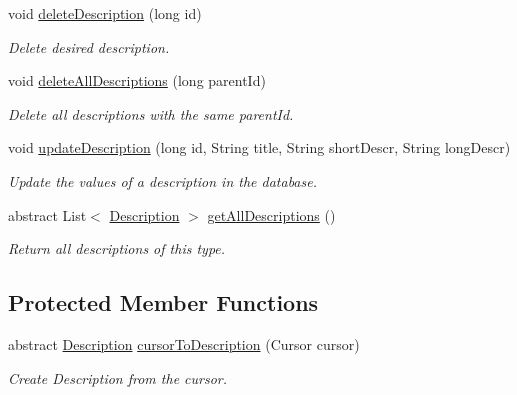 \begin{DoxyCompactItemize}
void \hyperlink{classuk_1_1ac_1_1swan_1_1digitaltrails_1_1database_1_1_description_data_source_af0c27ec463f89e831d2e8a0d4550cc1d}{delete\+Description} (long id)
\begin{DoxyCompactList}\small\item\em Delete desired description. \end{DoxyCompactList}\item 
void \hyperlink{classuk_1_1ac_1_1swan_1_1digitaltrails_1_1database_1_1_description_data_source_a5e81b67e1ed20a346146d36e1e94e664}{delete\+All\+Descriptions} (long parent\+Id)
\begin{DoxyCompactList}\small\item\em Delete all descriptions with the same parent\+Id. \end{DoxyCompactList}\item 
void \hyperlink{classuk_1_1ac_1_1swan_1_1digitaltrails_1_1database_1_1_description_data_source_a007f26b485f79cc640f41afe780eebc3}{update\+Description} (long id, String title, String short\+Descr, String long\+Descr)
\begin{DoxyCompactList}\small\item\em Update the values of a description in the database. \end{DoxyCompactList}\item 
abstract List$<$ \hyperlink{classuk_1_1ac_1_1swan_1_1digitaltrails_1_1components_1_1_description}{Description} $>$ \hyperlink{classuk_1_1ac_1_1swan_1_1digitaltrails_1_1database_1_1_description_data_source_a134b9b153811548f205493e00481464f}{get\+All\+Descriptions} ()
\begin{DoxyCompactList}\small\item\em Return all descriptions of this type. \end{DoxyCompactList}\end{DoxyCompactItemize}
\subsection*{Protected Member Functions}
\begin{DoxyCompactItemize}
\item 
abstract \hyperlink{classuk_1_1ac_1_1swan_1_1digitaltrails_1_1components_1_1_description}{Description} \hyperlink{classuk_1_1ac_1_1swan_1_1digitaltrails_1_1database_1_1_description_data_source_a3f5bcdc69a14876f36a0849e957b6b60}{cursor\+To\+Description} (Cursor cursor)
\begin{DoxyCompactList}\small\item\em Create Description from the cursor. \end{DoxyCompactList}\end{DoxyCompactItemize}

